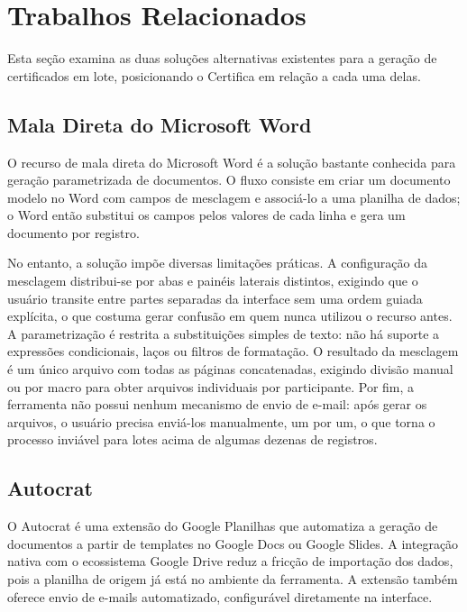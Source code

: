 \documentclass[article,a4paper,12pt,brazil,sumario=tradicional]{abntex2}
\begin{document}
\section{Trabalhos Relacionados}\label{sec:trabalhos-relacionados}

Esta seção examina as duas soluções alternativas existentes para a geração de certificados em lote, posicionando o Certifica em relação a cada uma delas.

\subsection{Mala Direta do Microsoft Word}

O recurso de mala direta do Microsoft Word \cite{microsoft2024mailmerge} é a solução bastante conhecida para geração parametrizada de documentos. O fluxo consiste em criar um documento modelo no Word com campos de mesclagem e associá-lo a uma planilha de dados; o Word então substitui os campos pelos valores de cada linha e gera um documento por registro.

No entanto, a solução impõe diversas limitações práticas. A configuração da mesclagem distribui-se por abas e painéis laterais distintos, exigindo que o usuário transite entre partes separadas da interface sem uma ordem guiada explícita, o que costuma gerar confusão em quem nunca utilizou o recurso antes. A parametrização é restrita a substituições simples de texto: não há suporte a expressões condicionais, laços ou filtros de formatação. O resultado da mesclagem é um único arquivo com todas as páginas concatenadas, exigindo divisão manual ou por macro para obter arquivos individuais por participante. Por fim, a ferramenta não possui nenhum mecanismo de envio de e-mail: após gerar os arquivos, o usuário precisa enviá-los manualmente, um por um, o que torna o processo inviável para lotes acima de algumas dezenas de registros.

\subsection{Autocrat}

O Autocrat \cite{autocrat2024} é uma extensão do Google Planilhas que automatiza a geração de documentos a partir de templates no Google Docs ou Google Slides. A integração nativa com o ecossistema Google Drive reduz a fricção de importação dos dados, pois a planilha de origem já está no ambiente da ferramenta. A extensão também oferece envio de e-mails automatizado, configurável diretamente na interface.
\end{document}
